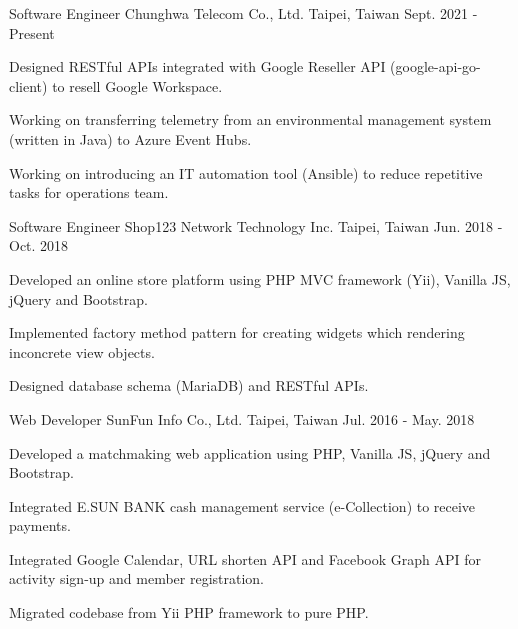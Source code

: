 

\begin{cventries}

  \cventry
    {Software Engineer} %
    {Chunghwa Telecom Co., Ltd.} %
    {Taipei, Taiwan} %
    {Sept. 2021 - Present} %
    {
      \begin{cvitems} %
        \item {Designed RESTful APIs integrated with Google Reseller API (google-api-go-client) to resell Google Workspace.}
        \item {Working on transferring telemetry from an environmental management system (written in Java) to Azure Event Hubs.}
        \item {Working on introducing an IT automation tool (Ansible) to reduce repetitive tasks for operations team.}
      \end{cvitems}
    }
  \cventry
    {Software Engineer} %
    {Shop123 Network Technology Inc.} %
    {Taipei, Taiwan} %
    {Jun. 2018 - Oct. 2018} %
    {
      \begin{cvitems} %
        \item {Developed an online store platform using PHP MVC framework (Yii), Vanilla JS, jQuery and Bootstrap.}
        \item {Implemented factory method pattern for creating widgets which rendering inconcrete view objects.}
        \item {Designed database schema (MariaDB) and RESTful APIs.}
      \end{cvitems}
    }

  \cventry
    {Web Developer} %
    {SunFun Info Co., Ltd.} %
    {Taipei, Taiwan} %
    {Jul. 2016 - May. 2018} %
    {
      \begin{cvitems} %
        \item {Developed a matchmaking web application using PHP, Vanilla JS, jQuery and Bootstrap.}
        \item {Integrated E.SUN BANK cash management service (e-Collection) to receive payments.}
        \item {Integrated Google Calendar, URL shorten API and Facebook Graph API for activity sign-up and member registration.}
        \item {Migrated codebase from Yii PHP framework to pure PHP.}
      \end{cvitems}
    }

\end{cventries}
